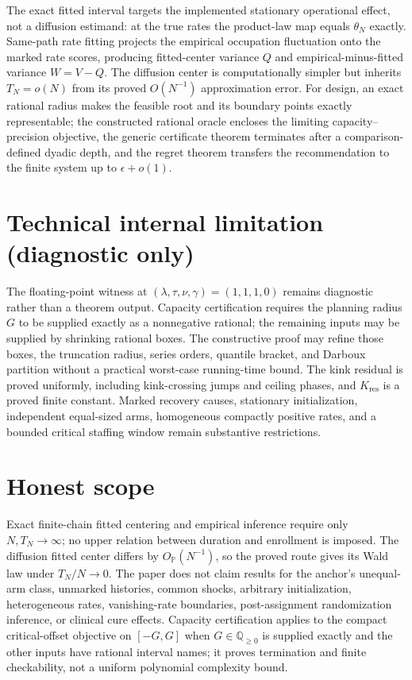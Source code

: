 \documentclass{article}
\begin{document}
The exact fitted interval targets the implemented stationary operational effect, not a diffusion estimand: at the true rates the product-law map equals \(\theta_N\) exactly. Same-path rate fitting projects the empirical occupation fluctuation onto the marked rate scores, producing fitted-center variance \(Q\) and empirical-minus-fitted variance \(W=V-Q\). The diffusion center is computationally simpler but inherits \(T_N=o(N)\) from its proved \(O(N^{-1})\) approximation error. For design, an exact rational radius makes the feasible root and its boundary points exactly representable; the constructed rational oracle encloses the limiting capacity--precision objective, the generic certificate theorem terminates after a comparison-defined dyadic depth, and the regret theorem transfers the recommendation to the finite system up to \(\epsilon+o(1)\).

\section*{Technical internal limitation (diagnostic only)}

The floating-point witness at \((\lambda,\tau,\nu,\gamma)=(1,1,1,0)\) remains diagnostic rather than a theorem output. Capacity certification requires the planning radius \(G\) to be supplied exactly as a nonnegative rational; the remaining inputs may be supplied by shrinking rational boxes. The constructive proof may refine those boxes, the truncation radius, series orders, quantile bracket, and Darboux partition without a practical worst-case running-time bound. The kink residual is proved uniformly, including kink-crossing jumps and ceiling phases, and \(K_{\mathrm{res}}\) is a proved finite constant. Marked recovery causes, stationary initialization, independent equal-sized arms, homogeneous compactly positive rates, and a bounded critical staffing window remain substantive restrictions.

\section{Honest scope}

Exact finite-chain fitted centering and empirical inference require only \(N,T_N\to\infty\); no upper relation between duration and enrollment is imposed. The diffusion fitted center differs by \(O_{\mathbb P}(N^{-1})\), so the proved route gives its Wald law under \(T_N/N\to0\). The paper does not claim results for the anchor's unequal-arm class, unmarked histories, common shocks, arbitrary initialization, heterogeneous rates, vanishing-rate boundaries, post-assignment randomization inference, or clinical cure effects. Capacity certification applies to the compact critical-offset objective on \([-G,G]\) when \(G\in\mathbb Q_{\geq0}\) is supplied exactly and the other inputs have rational interval names; it proves termination and finite checkability, not a uniform polynomial complexity bound.
\end{document}
